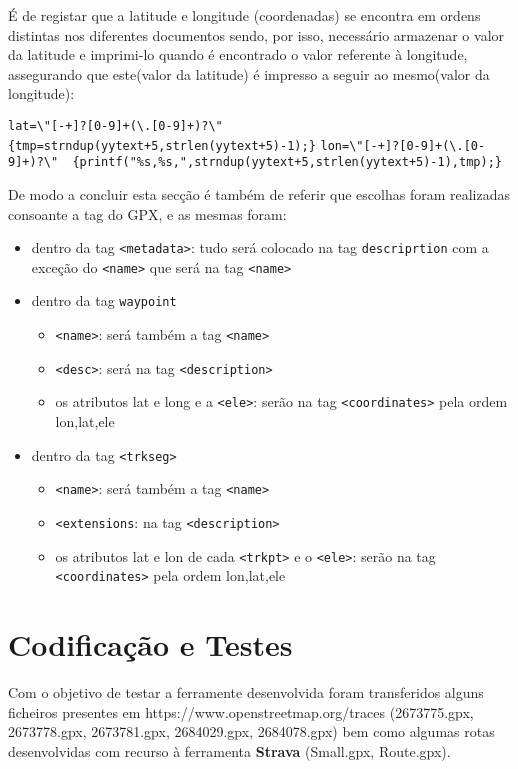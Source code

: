 \documentclass{llncs}
\begin{document}
É de registar que a latitude e longitude (coordenadas) se encontra em ordens distintas nos diferentes documentos sendo, por isso, necessário armazenar o valor da latitude
e imprimi-lo quando é encontrado o valor referente à longitude, assegurando que este(valor da latitude) é impresso a seguir ao mesmo(valor da longitude): 
\begin{changemargin}{-1cm}{0cm}
\verb|lat=\"[-+]?[0-9]+(\.[0-9]+)?\"  {tmp=strndup(yytext+5,strlen(yytext+5)-1);}|
\verb|lon=\"[-+]?[0-9]+(\.[0-9]+)?\"  {printf("%s,%s,",strndup(yytext+5,strlen(yytext+5)-1),tmp);}|
\end{changemargin}

De modo a concluir esta secção é também de referir que escolhas foram realizadas consoante a tag do GPX, e as mesmas foram:
\begin{itemize}
    \item dentro da tag \verb|<metadata>|: tudo será colocado na tag \verb|descriprtion| com a exceção do \verb|<name>| que será na tag \verb|<name>|
    \item dentro da tag \verb|waypoint|
        \begin{itemize}
            \item \verb|<name>|: será também a tag \verb|<name>|
            \item \verb|<desc>|: será na tag \verb|<description>|
            \item os atributos lat e long e a \verb|<ele>|: serão na tag \verb|<coordinates>| pela ordem lon,lat,ele
        \end{itemize}
    \item dentro da tag \verb|<trkseg>|
        \begin{itemize}
            \item \verb|<name>|: será também a tag \verb|<name>|
            \item \verb|<extensions|: na tag \verb|<description>|
            \item os atributos lat e lon de cada \verb|<trkpt>| e o \verb|<ele>|: serão na tag \verb|<coordinates>| pela ordem lon,lat,ele
        \end{itemize}
\end{itemize}

\section{Codificação e Testes}
Com o objetivo de testar a ferramente desenvolvida foram transferidos alguns ficheiros presentes em https://www.openstreetmap.org/traces (2673775.gpx, 2673778.gpx, 2673781.gpx, 2684029.gpx, 2684078.gpx) bem como algumas rotas desenvolvidas com recurso à ferramenta \textbf{Strava} (Small.gpx, Route.gpx).
\end{document}
